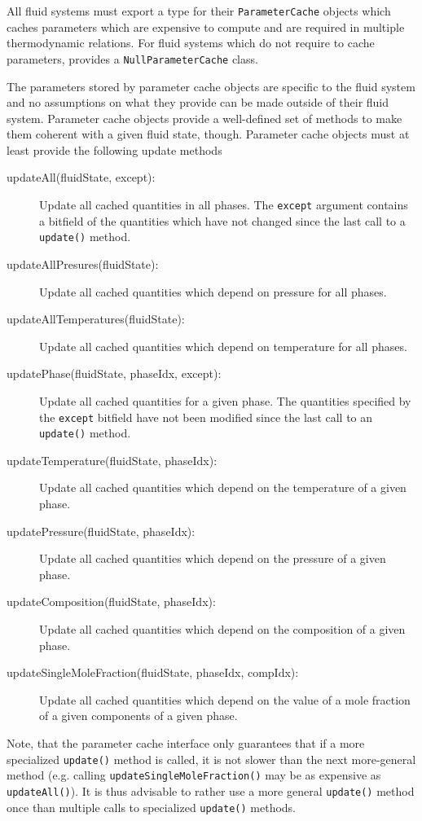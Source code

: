 All fluid systems must export a type for their \texttt{ParameterCache}
objects which caches parameters which are expensive to compute and are
required in multiple thermodynamic relations. For fluid systems which
do not require to cache parameters, \Dumux provides a
\texttt{NullParameterCache} class.

The parameters stored by parameter cache objects are specific to the
fluid system and no assumptions on what they provide can be made
outside of their fluid system. Parameter cache objects provide a
well-defined set of methods to make them coherent with a given fluid
state, though.  Parameter cache objects must at least provide the
following update methods
\begin{description}
\item[updateAll(fluidState, except):] Update all cached quantities in
  all phases. The \texttt{except} argument contains a bitfield of the
  quantities which have not changed since the last call to a
  \texttt{update()} method.
  \item[updateAllPresures(fluidState):]
    Update all cached quantities which depend on pressure for
    all phases.
  \item[updateAllTemperatures(fluidState):]
    Update all cached quantities which depend on temperature for
    all phases.
  \item[updatePhase(fluidState, phaseIdx, except):] Update all cached
    quantities for a given phase. The quantities specified by the
    \texttt{except} bitfield have not been modified since the last
    call to an \texttt{update()} method.
  \item[updateTemperature(fluidState, phaseIdx):] Update all cached
    quantities which depend on the temperature of a given phase.
  \item[updatePressure(fluidState, phaseIdx):] Update all cached
    quantities which depend on the pressure of a given phase.
  \item[updateComposition(fluidState, phaseIdx):] Update all cached
    quantities which depend on the composition of a given phase.
  \item[updateSingleMoleFraction(fluidState, phaseIdx, compIdx):]
    Update all cached quantities which depend on the value of a mole
    fraction of a given components of a given phase.
\end{description}
Note, that the parameter cache interface only guarantees that if a
more specialized \texttt{update()} method is called, it is not slower
than the next more-general method (e.g. calling
\texttt{updateSingleMoleFraction()} may be as expensive as
\texttt{updateAll()}). It is thus advisable to rather use a more
general \texttt{update()} method once than multiple calls to
specialized \texttt{update()} methods.

